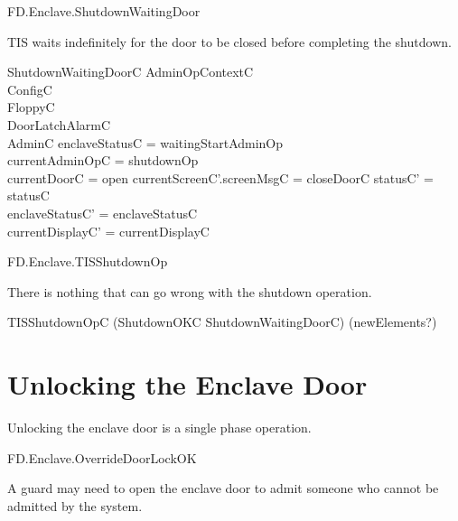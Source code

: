 \begin{traceunit}{FD.Enclave.ShutdownWaitingDoor}
\end{traceunit}

TIS waits indefinitely for the door to be closed before completing the shutdown.

\begin{schema}{ShutdownWaitingDoorC}
        AdminOpContextC
\also   
\\      \Xi ConfigC
\\      \Xi FloppyC
\\      \Xi DoorLatchAlarmC
\\      \Xi AdminC
\where
        enclaveStatusC = waitingStartAdminOp
\\      \The currentAdminOpC = shutdownOp
\\      currentDoorC = open
\also
        currentScreenC'.screenMsgC = closeDoorC
\also
        statusC' = statusC
\\      enclaveStatusC' = enclaveStatusC
\\      currentDisplayC' = currentDisplayC
\end{schema}

\begin{traceunit}{FD.Enclave.TISShutdownOp}
\end{traceunit}

There is nothing that can go wrong with the shutdown operation.

\begin{zed}
        TISShutdownOpC  (ShutdownOKC \lor ShutdownWaitingDoorC)
        \hide (newElements?)
\end{zed}

\section{Unlocking the Enclave Door}

Unlocking the enclave door is a single phase operation.

\begin{traceunit}{FD.Enclave.OverrideDoorLockOK}
\end{traceunit}

A guard may need to open the enclave door to admit someone who cannot
be admitted by the system.

